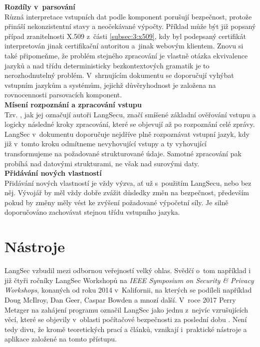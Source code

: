 \textbf{Rozdíly v~parsování} \\
Různá interpretace vstupních dat podle komponent porušují bezpečnost, protože přináší nekonzistentní stavy a neočekávané výpočty. Příklad může být 
již popsaný případ zranitelnosti X.509 z~části \ref{subsec:3:x509}, kdy byl podepsaný certifikát interpretován jinak certifikační autoritou a~jinak webovým 
klientem. Znovu si také připomeňme, že problém stejného zpracování je vlastně otázka ekvivalence jazyků a nad třídu deterministicky bezkontextových 
gramatik je to nerozhodnutelný problém. V~shrnujícím dokumentu \cite{LangSecBof} se doporučují vyhýbat vstupním jazykům a systémům, jejichž 
důvěryhodnost je založena na rovnocennosti parsovacích komponent. \\

\textbf{Mísení rozpoznání a zpracování vstupu} \\
Tzv. , jak jej označují autoři LangSecu, značí smíšené základní ověřování vstupu a logicky následné kroky zpracování,
které se objevují až po rozpoznání celé zprávy. 
LangSec v~dokumentu \cite{LangSecBof} doporučuje nejdříve plně rozpoznávat vstupní jazyk, kdy již v~tomto kroku odmítneme nevyhovující vstupy a ty
vyhovující transformujeme na požadované strukturované údaje. Samotné zpracování pak probíhá nad datovými strukturami, ne však nad surovými daty. \\

\textbf{Přidávání nových vlastností} \\
Přidávání nových vlastností je vždy výzva, ať už s~použitím LangSecu, nebo bez něj. Vývojář by měl vždy dobře zvážit důsledky změn na bezpečnost,
především pokud by změny měly vést ke zvýšení požadované výpočetní síly. Je silně doporučováno zachovávat stejnou třídu vstupního jazyka. 

\section{Nástroje} \label{sec:5:tools}
LangSec vzbudil mezi odbornou veřejností velký ohlas. 
Svědčí o~tom například i již čtyři ročníky LangSec Workshopů na \textit{IEEE Symposium on Security \& Privacy Workshops}, konaných od roku 2014 
v~Kalifornii, na kterých se podíleli například Doug McIlroy, Dan Geer, Caspar Bowden a mnozí další. V~roce 2017 Perry Metzger na zahájení programu 
označil LangSec jako jednu z~nejvíc vzrušujících věcí, které se objevily v~oblasti počítačové bezpečnosti za poslední dobu \cite{spw17key}. Není 
tedy divu, že kromě teoretických prací a článků, vznikají i~praktické nástroje a aplikace založené na tomto přístupu. \\

